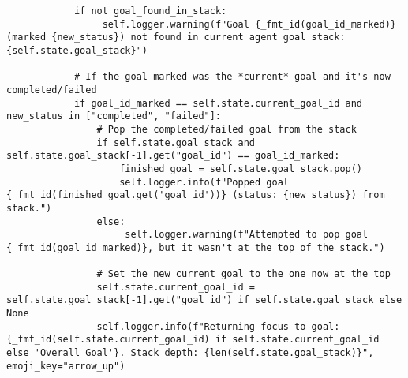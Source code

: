 \documentclass[12pt,a4paper]{article}
\begin{document}
\begin{pageablecode}
\begin{verbatim}
            if not goal_found_in_stack:
                 self.logger.warning(f"Goal {_fmt_id(goal_id_marked)} (marked {new_status}) not found in current agent goal stack: {self.state.goal_stack}")

            # If the goal marked was the *current* goal and it's now completed/failed
            if goal_id_marked == self.state.current_goal_id and new_status in ["completed", "failed"]:
                # Pop the completed/failed goal from the stack
                if self.state.goal_stack and self.state.goal_stack[-1].get("goal_id") == goal_id_marked:
                    finished_goal = self.state.goal_stack.pop()
                    self.logger.info(f"Popped goal {_fmt_id(finished_goal.get('goal_id'))} (status: {new_status}) from stack.")
                else:
                     self.logger.warning(f"Attempted to pop goal {_fmt_id(goal_id_marked)}, but it wasn't at the top of the stack.")

                # Set the new current goal to the one now at the top
                self.state.current_goal_id = self.state.goal_stack[-1].get("goal_id") if self.state.goal_stack else None
                self.logger.info(f"Returning focus to goal: {_fmt_id(self.state.current_goal_id) if self.state.current_goal_id else 'Overall Goal'}. Stack depth: {len(self.state.goal_stack)}", emoji_key="arrow_up")


\end{verbatim}
\end{pageablecode}
\end{document}
